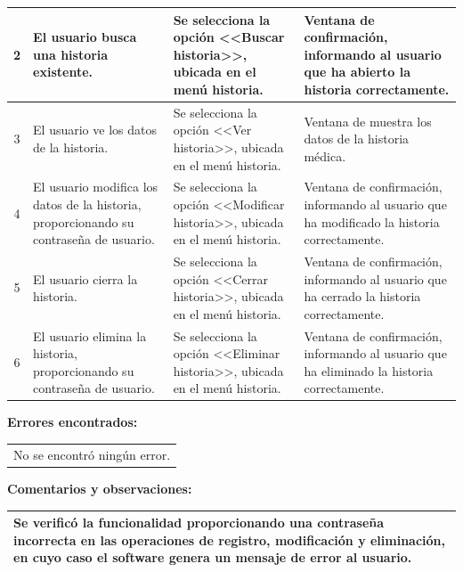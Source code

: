 {\begin{table}[h]
\begin{tabulary}{\anchotabla}{|c|J|J|J|}
			2 & El usuario busca una historia existente. & Se selecciona la opci\'{o}n <<Buscar historia>>, ubicada en el men\'{u} historia. & Ventana de confirmaci\'{o}n, informando al usuario que ha abierto la historia correctamente.\\ \hline
			
			3 & El usuario ve los datos de la historia. & Se selecciona la opci\'{o}n <<Ver historia>>, ubicada en el men\'{u} historia. & Ventana de muestra los datos de la historia m\'{e}dica.\\ \hline
			
			4 & El usuario modifica los datos de la historia, proporcionando su contrase\~{n}a de usuario. & Se selecciona la opci\'{o}n <<Modificar historia>>, ubicada en el men\'{u} historia. & Ventana de confirmaci\'{o}n, informando al usuario que ha modificado la historia correctamente.\\ \hline
			
			5 & El usuario cierra la historia. & Se selecciona la opci\'{o}n <<Cerrar historia>>, ubicada en el men\'{u} historia. & Ventana de confirmaci\'{o}n, informando al usuario que ha cerrado la historia correctamente.\\ \hline
			
			6 & El usuario elimina la historia, proporcionando su contrase\~{n}a de usuario. & Se selecciona la opci\'{o}n <<Eliminar historia>>, ubicada en el men\'{u} historia. & Ventana de confirmaci\'{o}n, informando al usuario que ha eliminado la historia correctamente.\\ \hline
		\end{tabulary}
\end{table}
\newpage
\textbf{Errores encontrados:}
\begin{table}[H]
	\centering
	\setlength{\extrarowheight}{\altocelda}
	\begin{tabularx}{\anchotabla}{|X|}
		\hline
		\thead{\textbf{\small{Descripci\'{o}n del error}}}
		\\ \hline
		No se encontr\'{o} ning\'{u}n error.\\ \hline
	\end{tabularx}
\end{table}

\textbf{Comentarios y observaciones:}
\begin{table}[H]
	\centering
	\setlength{\extrarowheight}{\altocelda}
	\begin{tabularx}{\anchotabla}{|X|}
		\hline
		Se verific\'{o} la funcionalidad proporcionando una contrase\~{n}a incorrecta en las operaciones de registro, modificaci\'{o}n y eliminaci\'{o}n, en cuyo caso el software genera un mensaje de error al usuario.\\ \hline
	\end{tabularx}
\end{table}

}
